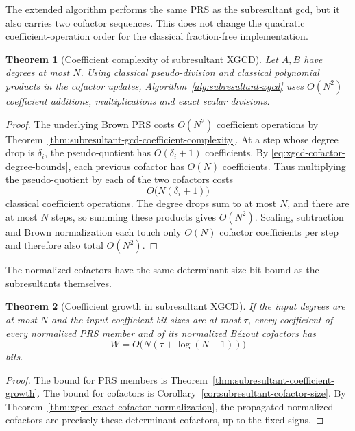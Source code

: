 \documentclass[11pt]{book}
\newtheorem{theorem}{Theorem}[section]
\theoremstyle{definition}
\begin{document}
The extended algorithm performs the same PRS as the subresultant gcd, but it
also carries two cofactor sequences.  This does not change the quadratic
coefficient-operation order for the classical fraction-free implementation.

\begin{theorem}[Coefficient complexity of subresultant XGCD]
\label{thm:xgcd-coefficient-complexity}
Let $A,B$ have degrees at most $N$.  Using classical pseudo-division and
classical polynomial products in the cofactor updates,
Algorithm~\ref{alg:subresultant-xgcd} uses $O(N^2)$ coefficient additions,
multiplications and exact scalar divisions.
\end{theorem}

\begin{proof}
The underlying Brown PRS costs $O(N^2)$ coefficient operations by
Theorem~\ref{thm:subresultant-gcd-coefficient-complexity}.  At a step whose
degree drop is $\delta_i$, the pseudo-quotient has $O(\delta_i+1)$
coefficients.  By \eqref{eq:xgcd-cofactor-degree-bounds}, each previous
cofactor has $O(N)$ coefficients.  Thus multiplying the pseudo-quotient by
each of the two cofactors costs
\[
 O\bigl(N(\delta_i+1)\bigr)
\]
classical coefficient operations.  The degree drops sum to at most $N$, and
there are at most $N$ steps, so summing these products gives $O(N^2)$.
Scaling, subtraction and Brown normalization each touch only $O(N)$
cofactor coefficients per step and therefore also total $O(N^2)$.
\end{proof}

The normalized cofactors have the same determinant-size bit bound as the
subresultants themselves.

\begin{theorem}[Coefficient growth in subresultant XGCD]
\label{thm:xgcd-coefficient-growth}
If the input degrees are at most $N$ and the input coefficient bit sizes are
at most $\tau$, every coefficient of every normalized PRS member and of its
normalized B\'ezout cofactors has
\begin{equation}\label{eq:xgcd-normalized-bit-bound}
 W=O\bigl(N(\tau+\log(N+1))\bigr)
\end{equation}
bits.
\end{theorem}

\begin{proof}
The bound for PRS members is
Theorem~\ref{thm:subresultant-coefficient-growth}.  The bound for cofactors is
Corollary~\ref{cor:subresultant-cofactor-size}.  By
Theorem~\ref{thm:xgcd-exact-cofactor-normalization}, the propagated normalized
cofactors are precisely these determinant cofactors, up to the fixed signs.
\end{proof}
\end{document}
